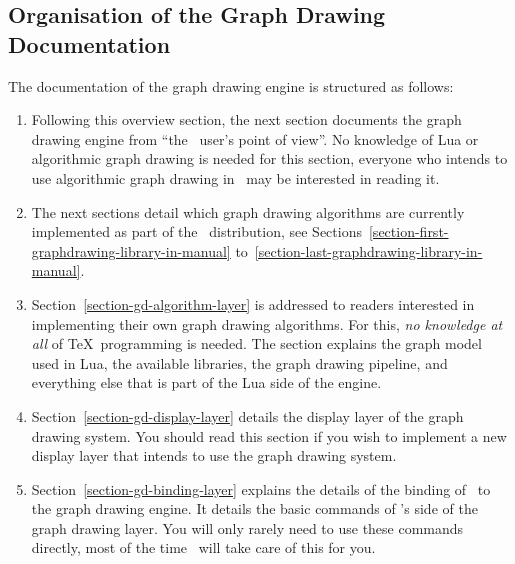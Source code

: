 \subsection{Organisation of the Graph Drawing Documentation}

The documentation of the graph drawing engine is structured as
follows:
\begin{enumerate}
\item Following this overview section, the next section documents
  the graph drawing engine from ``the \tikzname\ user's point of
  view''. No knowledge of Lua or algorithmic graph drawing is needed
  for this section, everyone who intends to use algorithmic graph
  drawing in \tikzname\ may be interested in reading it.
\item The next sections detail which graph drawing algorithms are
  currently implemented as part of the \tikzname\ distribution, see
  Sections~\ref{section-first-graphdrawing-library-in-manual}
  to~\ref{section-last-graphdrawing-library-in-manual}.
\item
  Section~\ref{section-gd-algorithm-layer} is addressed to readers
  interested in implementing their own graph drawing
  algorithms. For this, \emph{no knowledge at all} of \TeX\
  programming is needed. The section explains the graph model used in
  Lua, the available libraries, the graph drawing pipeline, and everything
  else that is part of the Lua side of the engine.
\item
  Section~\ref{section-gd-display-layer} details the
  display layer of the graph drawing system.  You should read this 
  section if you wish to implement a new display layer that intends to
  use the graph drawing system.
\item
  Section~\ref{section-gd-binding-layer} explains the details of the
  binding of \pgfname\ to the graph drawing engine. It
  details the basic commands of \pgfname's side of the graph drawing
  layer. You will only rarely need to use these commands directly,
  most of the time \tikzname\ will take care of this for you.
\end{enumerate}


